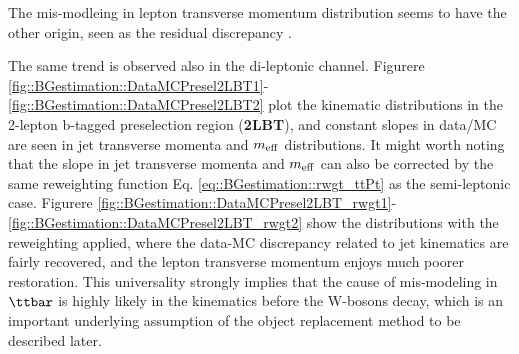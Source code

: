 The mis-modleing in lepton transverse momentum distribution seems to have the other origin, seen as the residual discrepancy . \\


\clearpage


%
\clearpage

\clearpage
The same trend is observed also in the di-leptonic channel. Figurere \ref{fig::BGestimation::DataMCPresel2LBT1}-\ref{fig::BGestimation::DataMCPresel2LBT2} plot the kinematic distributions in the 2-lepton b-tagged preselection region (\textbf{2LBT}), and constant slopes in data/MC are seen in jet transverse momenta and $m_{\mathrm{eff}}$ distributions.
It might worth noting that the slope in jet transverse momenta and $m_{\mathrm{eff}}$ can also be corrected by the same reweighting function Eq. \ref{eq::BGestimation::rwgt_ttPt} as the semi-leptonic case. Figurere \ref{fig::BGestimation::DataMCPresel2LBT_rwgt1}-\ref{fig::BGestimation::DataMCPresel2LBT_rwgt2} show the distributions with the reweighting applied, where the data-MC discrepancy related to jet kinematics are fairly recovered, and the lepton transverse momentum enjoys much poorer restoration. 
This universality strongly implies that the cause of mis-modeling in $\ttbar$ is highly likely in the kinematics before the W-bosons decay, which is an important underlying assumption of the object replacement method to be described later. \\


\clearpage


\clearpage

